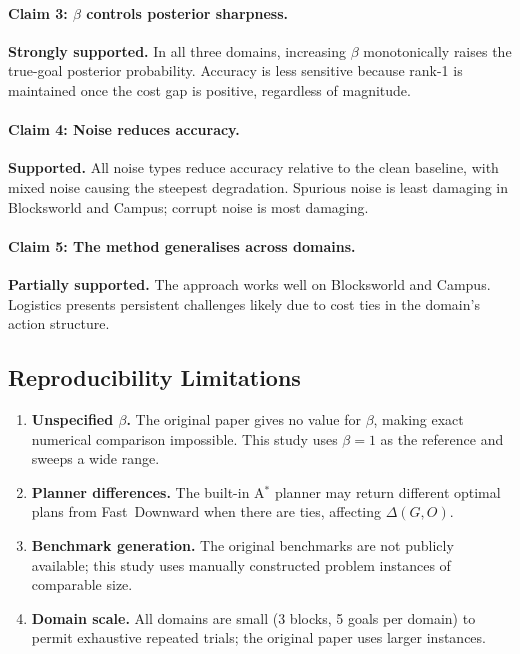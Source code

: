 \documentclass[11pt,a4paper]{article}
\begin{document}
\paragraph{Claim 3: $\beta$ controls posterior sharpness.}
\textbf{Strongly supported.}  In all three domains, increasing $\beta$
monotonically raises the true-goal posterior probability.  Accuracy is
less sensitive because rank-1 is maintained once the cost gap is positive,
regardless of magnitude.

\paragraph{Claim 4: Noise reduces accuracy.}
\textbf{Supported.}  All noise types reduce accuracy relative to the
clean baseline, with mixed noise causing the steepest degradation.
Spurious noise is least damaging in Blocksworld and Campus; corrupt
noise is most damaging.

\paragraph{Claim 5: The method generalises across domains.}
\textbf{Partially supported.}  The approach works well on Blocksworld and
Campus.  Logistics presents persistent challenges likely due to cost
ties in the domain's action structure.

\subsection{Reproducibility Limitations}

\begin{enumerate}
  \item \textbf{Unspecified $\beta$.}  The original paper gives no value for
        $\beta$, making exact numerical comparison impossible.  This study
        uses $\beta = 1$ as the reference and sweeps a wide range.
  \item \textbf{Planner differences.}  The built-in A$^*$ planner may return
        different optimal plans from Fast~Downward when there are ties,
        affecting $\Delta(G,O)$.
  \item \textbf{Benchmark generation.}  The original benchmarks are not
        publicly available; this study uses manually constructed problem
        instances of comparable size.
  \item \textbf{Domain scale.}  All domains are small (3 blocks, 5 goals per
        domain) to permit exhaustive repeated trials; the original paper
        uses larger instances.
\end{enumerate}
\end{document}
